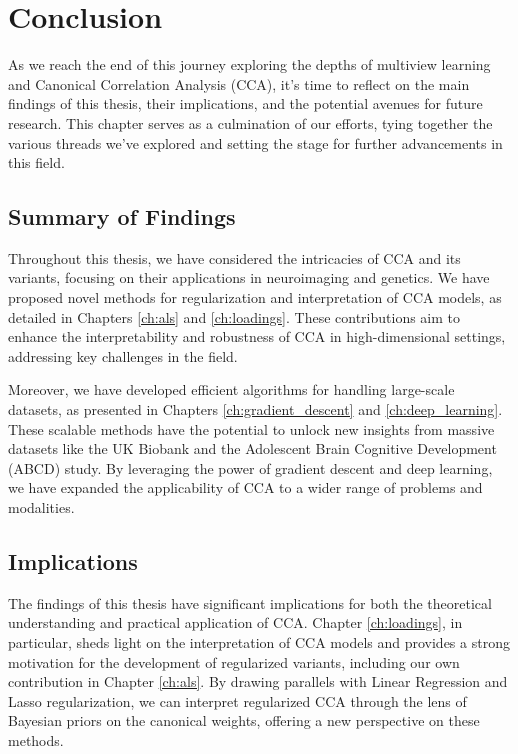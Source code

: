 \chapter{Conclusion}
\label{ch:discussion}

As we reach the end of this journey exploring the depths of multiview learning and Canonical Correlation Analysis (CCA), it's time to reflect on the main findings of this thesis, their implications, and the potential avenues for future research. This chapter serves as a culmination of our efforts, tying together the various threads we've explored and setting the stage for further advancements in this field.

\section{Summary of Findings}

Throughout this thesis, we have considered the intricacies of CCA and its variants, focusing on their applications in neuroimaging and genetics. We have proposed novel methods for regularization and interpretation of CCA models, as detailed in Chapters \ref{ch:als} and \ref{ch:loadings}. These contributions aim to enhance the interpretability and robustness of CCA in high-dimensional settings, addressing key challenges in the field.

Moreover, we have developed efficient algorithms for handling large-scale datasets, as presented in Chapters \ref{ch:gradient_descent} and \ref{ch:deep_learning}. These scalable methods have the potential to unlock new insights from massive datasets like the UK Biobank and the Adolescent Brain Cognitive Development (ABCD) study. By leveraging the power of gradient descent and deep learning, we have expanded the applicability of CCA to a wider range of problems and modalities.

\section{Implications}

The findings of this thesis have significant implications for both the theoretical understanding and practical application of CCA. Chapter \ref{ch:loadings}, in particular, sheds light on the interpretation of CCA models and provides a strong motivation for the development of regularized variants, including our own contribution in Chapter \ref{ch:als}. By drawing parallels with Linear Regression and Lasso regularization, we can interpret regularized CCA through the lens of Bayesian priors on the canonical weights, offering a new perspective on these methods.

